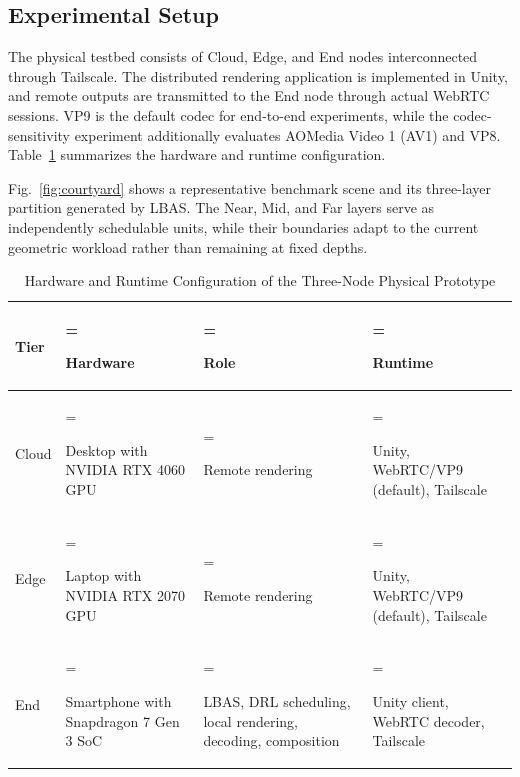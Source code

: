 \documentclass[10pt,journal,compsoc]{IEEEtran}
\begin{document}
\subsection{Experimental Setup}

The physical testbed consists of Cloud, Edge, and End nodes interconnected through Tailscale. The distributed rendering application is implemented in Unity, and remote outputs are transmitted to the End node through actual WebRTC sessions. VP9 is the default codec for end-to-end experiments, while the codec-sensitivity experiment additionally evaluates AOMedia Video 1 (AV1) and VP8. Table~\ref{tab:prototype_config} summarizes the hardware and runtime configuration.

Fig.~\ref{fig:courtyard} shows a representative benchmark scene and its three-layer partition generated by LBAS. The Near, Mid, and Far layers serve as independently schedulable units, while their boundaries adapt to the current geometric workload rather than remaining at fixed depths.

\begin{table}[t]
	\centering
	\caption{Hardware and Runtime Configuration of the Three-Node Physical Prototype}
	\label{tab:prototype_config}
	\footnotesize
	\setlength{\tabcolsep}{6pt}
	\renewcommand{\arraystretch}{1.05}
	\begin{tabularx}{\textwidth}{@{}l
		>{\hsize=1.1\hsize\linewidth=\hsize\raggedright\arraybackslash}X
		>{\hsize=1.0\hsize\linewidth=\hsize\raggedright\arraybackslash}X
		>{\hsize=0.9\hsize\linewidth=\hsize\raggedright\arraybackslash}X@{}}
			\toprule
			\textbf{Tier} & \textbf{Hardware} & \textbf{Role} & \textbf{Runtime} \\
			\midrule
			Cloud &
			Desktop with NVIDIA RTX 4060 GPU &
			Remote rendering &
			Unity, WebRTC/VP9 (default), Tailscale \\
			Edge &
			Laptop with NVIDIA RTX 2070 GPU &
			Remote rendering &
			Unity, WebRTC/VP9 (default), Tailscale \\
			End &
			Smartphone with Snapdragon 7 Gen 3 SoC &
			LBAS, DRL scheduling, local rendering, decoding, composition &
			Unity client, WebRTC decoder, Tailscale \\
			\bottomrule
	\end{tabularx}
\end{table}
\end{document}
